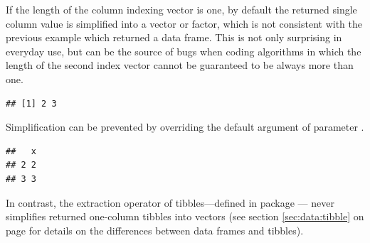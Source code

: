 \documentclass[krantz2]{krantz}\usepackage{knitr}
\begin{document}
\begin{explainbox}
If the length of the column indexing vector is one, by default the returned single column value is simplified into a vector or factor, which is not consistent with the previous example which returned a data frame. This is not only surprising in everyday use, but can be the source of bugs when coding algorithms in which the length of the second index vector cannot be guaranteed to be always more than one.

\begin{knitrout}\footnotesize
{}\color{fgcolor}\begin{kframe}
\begin{alltt}
\hlstd{a.df[}\hlopt{:}\hlstd{,} \hlstd{]}
\end{alltt}
\begin{verbatim}
## [1] 2 3
\end{verbatim}
\end{kframe}
\end{knitrout}

Simplification can be prevented by overriding the default argument of parameter .

\begin{knitrout}\footnotesize
{}\color{fgcolor}\begin{kframe}
\begin{alltt}
\hlstd{a.df[}\hlopt{:}\hlstd{,} \hlstd{,}  \hlstd{=} \hlstd{]}
\end{alltt}
\begin{verbatim}
##   x
## 2 2
## 3 3
\end{verbatim}
\end{kframe}
\end{knitrout}

In contrast, the extraction operator \Roperator{[ ]} of tibbles---defined in package --- never simplifies returned one-column tibbles into vectors (see section \ref{sec:data:tibble} on page \pageref{sec:data:tibble} for details on the differences between data frames and tibbles).
\end{explainbox}
\end{document}
